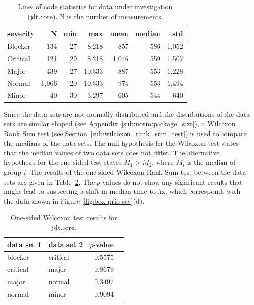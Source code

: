 \begin{table}[!ht]\footnotesize
	\centering
	\begin{tabular}{lrrrrrr}
		\toprule
		severity & N & min & max & mean & median & std \\
		\midrule
		Blocker & 134 & 27 & 8,218 & 857 & 586 & 1,052\\
		Critical & 121 & 29 & 8,218 & 1,046 & 559 & 1,507\\
		Major & 439 & 27 & 10,833 & 887 & 553 & 1,228\\
		Normal & 1,966 & 20 & 10,833 & 974 & 553 & 1,494\\
		Minor & 40 & 30 & 3,297 & 605 & 544 & 640\\
		\bottomrule
	\end{tabular} 
	\caption{Lines of code statistics for data under investigation (jdt.core). N is the number of measurements.}
	\label{tab:statistics-invg}
\end{table}

Since the data sets are not normally distributed and the distributions of the data sets are similar shaped (see Appendix~\ref{sub:norm:package_size}), a Wilcoxon Rank Sum test (see Section~\ref{sub:wilcoxon_rank_sum_test}) is used to compare the medians of the data sets. The null hypothesis for the Wilcoxon test states that the median values of two data sets does not differ. The alternative hypothesis for the one-sided test states $M_1 > M_2$, where $M_i$ is the median of group $i$. The results of the one-sided Wilcoxon Rank Sum test between the data sets are given in Table~\ref{tab:wilcoxon-sev-core}. The $p$-values do not show any significant results that might lead to suspecting a shift in median time-to-fix, which corresponds with the data shown in Figure~\ref{fig:box-prio-sev}(d).

\begin{table}[!ht]\footnotesize
	\centering
	\begin{tabular}{llrl}
		\toprule
		data set 1 & data set 2 & $p$-value & \\
		\midrule
		blocker & critical & $0.5575$ & \\
		critical & major & $0.8679$ & \\
		major & normal & $0.3497$ & \\
		normal & minor & $0.9094$ & \\
		\bottomrule
	\end{tabular} 
	\caption{One-sided Wilcoxon test results for jdt.core.}
	\label{tab:wilcoxon-sev-core}
\end{table}

